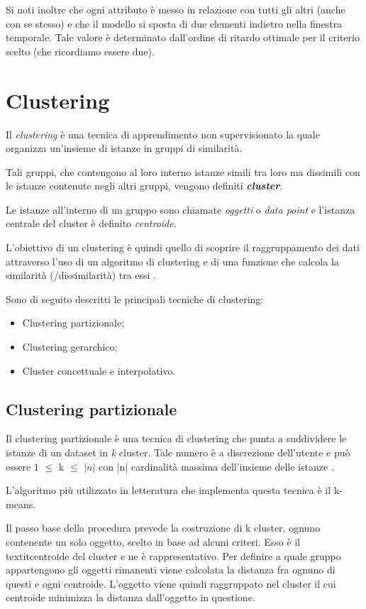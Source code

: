 \documentclass[12pt,a4paper,oneside,openright]{book}
\begin{document}
Si noti inoltre che ogni attributo è messo in relazione con tutti gli altri (anche con se stesso) e che il modello si sposta di due elementi indietro nella finestra temporale. Tale valore è determinato dall'ordine di ritardo ottimale per il criterio scelto (che ricordiamo essere due).
\newpage
\section{Clustering}
Il \textit{clustering} è una tecnica di apprendimento non supervisionato la quale organizza un'insieme di istanze in gruppi di similarità. 

Tali gruppi, che contengono al loro interno istanze simili tra loro ma dissimili con le istanze contenute negli altri gruppi, vengono definiti \textit{\textbf{cluster}}. 

Le istanze all'interno di un gruppo sono chiamate \textit{oggetti} o \textit{data point} e l'istanza centrale del cluster è definito \textit{centroide}.

L'obiettivo di un clustering è quindi quello di scoprire il raggruppamento dei dati attraverso l'uso di un algoritmo di clustering e di una funzione che calcola la similarità (/dissimilarità) tra essi \cite{16a}.

Sono di seguito descritti le principali tecniche di clustering:
\begin{itemize}
\item Clustering partizionale;
\item Clustering gerarchico;
\item Cluster concettuale e interpolativo.
\end{itemize}

\subsection{Clustering partizionale}
Il clustering partizionale è una tecnica di clustering che punta a suddividere le istanze di un dataset in \textit{k} cluster. Tale numero è a discrezione dell'utente e può essere $1$ $\leq$ k $\leq$ $|n|$ con |n| cardinalità massima dell'insieme delle istanze \cite{17a}. 

L'algoritmo più utilizzato in letteratura che implementa questa tecnica è il k-means.

Il passo base della procedura prevede la costruzione di k cluster, ognuno contenente un solo oggetto, scelto in base ad alcuni criteri. Esso è il textit{centroide} del cluster e ne è rappresentativo. Per definire a quale gruppo appartengono gli oggetti rimanenti viene calcolata la distanza fra ognuno di questi e ogni centroide. L’oggetto viene quindi raggruppato nel cluster il cui centroide minimizza la distanza dall’oggetto in questione.
\end{document}
